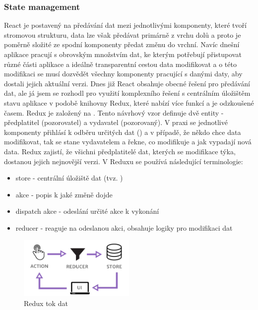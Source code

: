 \subsubsection{State management}
React je postavený na předávání dat mezi jednotlivými komponenty, které tvoří stromovou strukturu, data lze však předávat primárně z vrchu dolů a proto je poměrně složité ze spodní komponenty předat změnu do vrchní. Navíc dnešní aplikace pracují s obrovským množstvím dat, ke kterým potřebují přistupovat různé části aplikace a ideálně transparentní cestou data modifikovat a o této modifikaci se musí dozvědět všechny komponenty pracující s danými daty, aby dostali jejich aktuální verzi. Dnes již React obsahuje obecné řešení pro předávání dat, ale já jsem se rozhodl pro využití komplexního řešení s centrálním úložištěm stavu aplikace v podobě knihovny Redux, které nabízí více funkcí a je odzkoušené časem. Redux je založený na . Tento návrhový vzor definuje dvě entity - předplatitel (pozorovatel) a vydavatel (pozorovaný). V praxi se jednotlivé komponenty přihlásí k odběru určitých dat () a v případě, že někdo chce data modifikovat, tak se stane vydavatelem a řekne, co modifikuje a jak vypadají nová data. Redux zajistí, že všichni předplatitelé dat, kterých se modifikace týka, dostanou jejich nejnovější verzi. V Reduxu se používá následující terminologie:
\begin{itemize}
    \item store - centrální úložiště dat (tvz. )
    \item akce - popis k jaké změně dojde
    \item dispatch akce - odeslání určité akce k vykonání
    \item reducer - reaguje na odeslanou akci, obsahuje logiky pro modifikaci dat
\end{itemize}
\begin{figure}[htbp]
    \centering
    \includegraphics[width=0.5\textwidth]{img/redux.png}
    \caption{Redux tok dat \cite{img-redux-flow}}
\end{figure}

